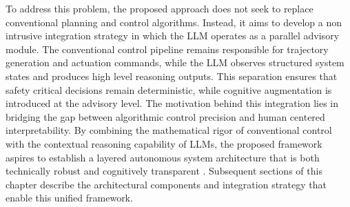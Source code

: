 \documentclass[a4paper,12pt,one side]{report}
\theoremstyle{definition}
\begin{document}
\begin{itemize}
To address this problem, the proposed approach does not seek to replace conventional planning and control algorithms. Instead, it aims to develop a non intrusive integration strategy in which the LLM operates as a parallel advisory module. The conventional control pipeline remains responsible for trajectory generation and actuation commands, while the LLM observes structured system states and produces high level reasoning outputs. This separation ensures that safety critical decisions remain deterministic, while cognitive augmentation is introduced at the advisory level.
The motivation behind this integration lies in bridging the gap between algorithmic control precision and human centered interpretability. By combining the mathematical rigor of conventional control with the contextual reasoning capability of LLMs, the proposed framework aspires to establish a layered autonomous system architecture that is both technically robust and cognitively transparent \cite{tekkesinoglu2025advancing}. Subsequent sections of this chapter describe the architectural components and integration strategy that enable this unified framework.

\end{itemize}
\end{document}
